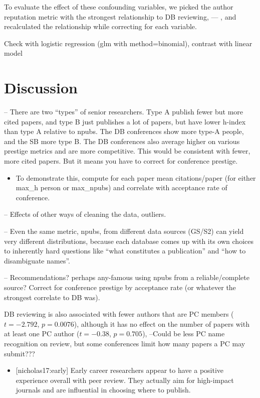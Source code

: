 \documentclass[12pt]{article}
\providecommand{\tightlist}{%
  \setlength{\itemsep}{0pt}\setlength{\parskip}{0pt}}
\begin{document}
To evaluate the effect of these confounding variables, we picked the author reputation metric with the strongest relationship to DB reviewing, --- , and recalculated the relationship while correcting for each variable.

Check with logistic regression (glm with method=binomial), contrast with linear model

\hypertarget{sec:discussion}{%
\section{Discussion}\label{sec:discussion}}

-- There are two ``types'' of senior researchers. Type A publish fewer but more cited papers, and type B just publishes a lot of papers, but have lower h-index than type A relative to npubs. The DB conferences show more type-A people, and the SB more type B. The DB conferences also average higher on various prestige metrics and are more competitive. This would be consistent with fewer, more cited papers. But it means you have to correct for conference prestige.

\begin{itemize}
\tightlist
\item
  To demonstrate this, compute for each paper mean citations/paper (for either max\_h person or max\_npubs) and correlate with acceptance rate of conference.
\end{itemize}

-- Effects of other ways of cleaning the data, outliers.

-- Even the same metric, npubs, from different data sources (GS/S2) can yield very different distributions, because each database comes up with its own choices to inherently hard questions like ``what constitutes a publication'' and ``how to disambiguate names''.

-- Recommendations? perhaps any-famous using npubs from a reliable/complete source? Correct for conference prestige by acceptance rate (or whatever the strongest correlate to DB was).

DB reviewing is also associated with fewer authors that are PC members
(\(t=-2.792\), \(p=0.0076\)),
although it has no effect on the number of papers with at least one PC author
(\(t=-0.38\), \(p=0.705\)),
--Could be less PC name recognition on review, but some conferences limit how many papers a PC may submit???

\begin{itemize}
\tightlist
\item
  {[}nicholas17:early{]} Early career researchers appear to have a positive experience overall with peer review. They actually aim for high-impact journals and are influential in choosing where to publish.
\end{itemize}
\end{document}
